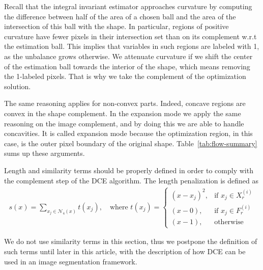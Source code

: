 \documentclass[smallextended]{svjour3}       %
\begin{document}
Recall that the integral invariant estimator approaches curvature by computing the difference between half of the area
of a chosen ball and the area of the intersection of this ball with the shape.  In particular, regions of positive
curvature have fewer pixels in their intersection set than on its complement w.r.t the estimation ball. This implies
that variables in such regions are labeled with 1, as the unbalance grows otherwise. We attenuate curvature if we shift
the center of the estimation ball towards the interior of the shape, which means removing the 1-labeled pixels. That is
why we take the complement of the optimization solution.

The same reasoning applies for non-convex parts. Indeed, concave regions are convex in the shape complement. In the
expansion mode we apply the same reasoning on the image complement, and by doing this we are able to handle
concavities. It is called expansion mode because the optimization region, in this case, is the outer pixel boundary of
the original shape. Table~\ref{tab:flow-summary} sums up these arguments.

Length and similarity terms should be properly defined in order to comply with the complement step of the DCE
algorithm. The length penalization is defined as
\begin{align}
  s(x)=\sum_{x_j \in \mathcal{N}_4(x)}{ t(x_j) }, \quad \text{where } t(x_j) = \left\{\begin{array}{ll}
  (x-x_j)^2, & \text{if } x_j \in X_{r}^{(i)}\\
  (x-0), & \text{if } x_j \in F_{r}^{(i)}\\
  (x-1), & \text{otherwise }
  \end{array}\right.
  \label{eq:length-penalization}
\end{align}
	
We do not use similarity terms in this section, thus we postpone the definition of such terms until later in this
article, with the description of how DCE can be used in an image segmentation framework.
\end{document}
